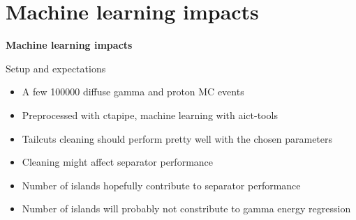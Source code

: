 
\section{Machine learning impacts}

\begin{frame}
    \centering
    {\Huge \textbf{Machine learning impacts}}
\end{frame}

\begin{frame}{Setup and expectations}
    \begin{itemize}
        \item A few \num{100000} diffuse gamma and proton MC events
        \item {Preprocessed with ctapipe, machine learning with
              aict-tools \\ {\footnotesize{\cite{aict}}}}
        \vspace{15pt}
        \item Tailcuts cleaning should perform pretty well with the chosen parameters
        \item Cleaning might affect separator performance
        \item Number of islands hopefully contribute to separator performance
        \item Number of islands will probably not constribute to gamma energy regression
    \end{itemize}
\end{frame}

